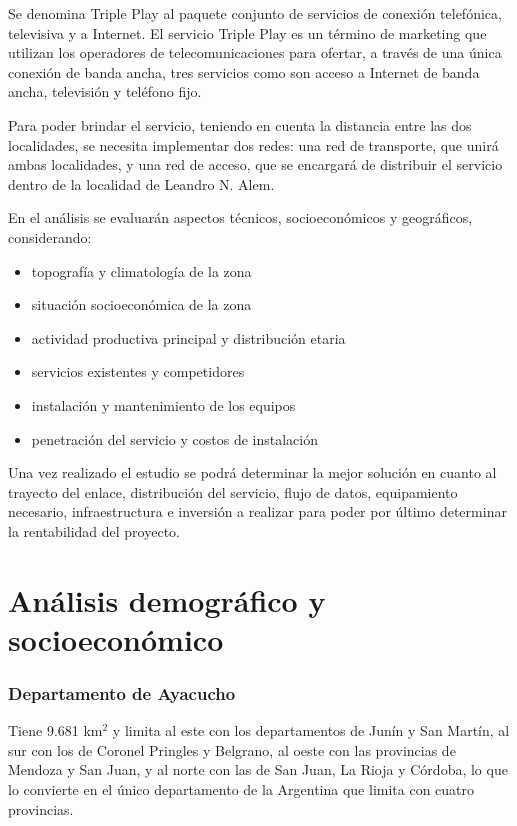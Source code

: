 \documentclass[11pt,a4paper]{article}
\begin{document}
Se denomina Triple Play al paquete conjunto de servicios de conexión telefónica, televisiva y a Internet. El servicio Triple Play es un término de marketing que utilizan los operadores de telecomunicaciones para ofertar, a través de una única conexión de banda ancha, tres servicios como son acceso a Internet de banda ancha, televisión y teléfono fijo.

Para poder brindar el servicio, teniendo en cuenta la distancia entre las dos localidades, se necesita implementar dos redes: una red de transporte, que unirá ambas localidades, y una red de acceso, que se encargará de distribuir el servicio dentro de la localidad de Leandro N. Alem.

En el análisis se evaluarán aspectos técnicos, socioeconómicos y geográficos, considerando:

\begin{itemize}
    \item topografía y climatología de la zona
    \item situación socioeconómica de la zona
    \item actividad productiva principal y distribución etaria
    \item servicios existentes y competidores
    \item instalación y mantenimiento de los equipos
    \item penetración del servicio y costos de instalación
\end{itemize}

Una vez realizado el estudio se podrá determinar la mejor solución en cuanto al trayecto del enlace, distribución del servicio, flujo de datos, equipamiento necesario, infraestructura e inversión a realizar para poder por último determinar la rentabilidad del proyecto.

\clearpage
\part{Análisis demográfico y socioeconómico}

\section{Departamento de Ayacucho}
Tiene 9.681 km$^2$ y limita al este con los departamentos de Junín y San Martín, al sur con los de Coronel Pringles y Belgrano, al oeste con las provincias de Mendoza y San Juan, y al norte con las de San Juan, La Rioja y Córdoba, lo que lo convierte en el único departamento de la Argentina que limita con cuatro provincias.
\end{document}
